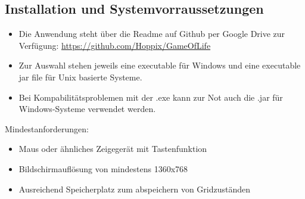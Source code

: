 \documentclass[12pt]{article}
\theoremstyle{plain}
\begin{document}
\subsection{Installation und Systemvorraussetzungen}
\begin{itemize}
\item Die Anwendung steht über die Readme auf Github per Google Drive zur Verfügung: \url{https://github.com/Hoppix/GameOfLife}
\item Zur Auswahl stehen jeweils eine executable für Windows und eine executable jar file für Unix basierte Systeme.
\item Bei Kompabilitätsproblemen mit der .exe kann zur Not auch die .jar für Windows-Systeme verwendet werden.
\end{itemize}
Mindestanforderungen:
\begin{itemize}
\item Maus oder ähnliches Zeigegerät mit Tastenfunktion
\item Bildschirmauflösung von mindestens 1360x768
\item Ausreichend Speicherplatz zum abspeichern von Gridzuständen
\end{itemize}
\end{document}
